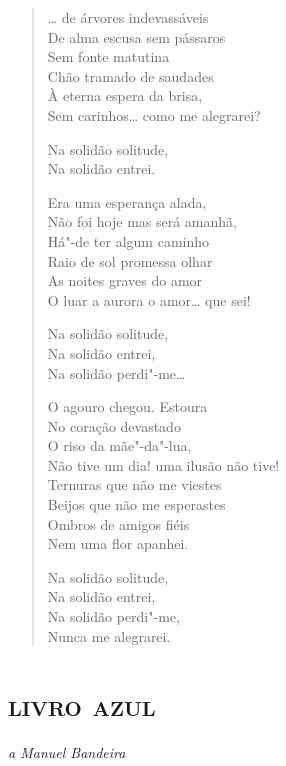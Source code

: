 

\begin{verse}
\ldots{} de árvores indevassáveis\\
De alma escusa sem pássaros\\
Sem fonte matutina\\
Chão tramado de saudades\\
À eterna espera da brisa,\\
Sem carinhos\ldots{} como me alegrarei?

Na solidão solitude,\\
Na solidão entrei.

Era uma esperança alada,\\
Não foi hoje mas será amanhã,\\
Há"-de ter algum caminho\\
Raio de sol promessa olhar\\
As noites graves do amor\\
O luar a aurora o amor\ldots{} que sei!

Na solidão solitude,\\
Na solidão entrei,\\
Na solidão perdi"-me\ldots{}

O agouro chegou. Estoura\\
No coração devastado\\
O riso da mãe"-da"-lua,\\
Não tive um dia! uma ilusão não tive!\\
Ternuras que não me viestes\\
Beijos que não me esperastes\\
Ombros de amigos fiéis\\
Nem uma flor apanhei.

Na solidão solitude,\\
Na solidão entrei,\\
Na solidão perdi"-me,\\
Nunca me alegrarei.
\end{verse}

\movetooddpage
\part{\textsc{livro azul}}


\begin{flushright}
\emph{a Manuel Bandeira}
\end{flushright}

